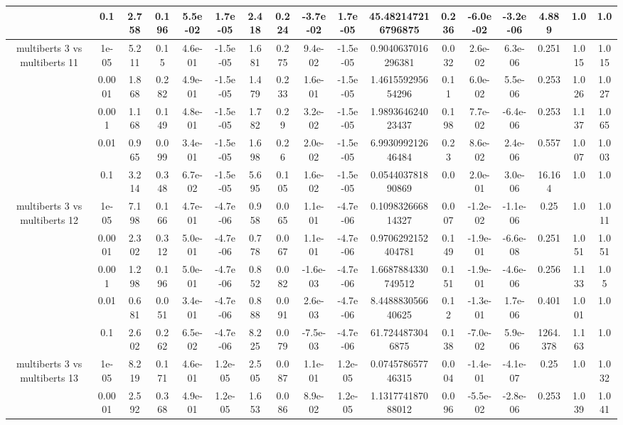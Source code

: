 \begin{tabular}{|c|c|c|c|c|c|c|c|c|c|c|c|c|c|c|c|c|}
 & 0.1 & 2.758 & 0.196 & 5.5e-02 & 1.7e-05 & 2.418 & 0.224 & -3.7e-02 & 1.7e-05 & 45.482147216796875 & 0.236 & -6.0e-02 & -3.2e-06 & 4.889 & 1.0 & 1.0 \\
\hline
\multirow{5}{*}{multiberts 3 vs multiberts 11} & 1e-05 & 5.211 & 0.15 & 4.6e-01 & -1.5e-05 & 1.681 & 0.275 & 9.4e-02 & -1.5e-05 & 0.9040637016296381 & 0.032 & 2.6e-02 & 6.3e-06 & 0.251 & 1.015 & 1.015 \\
 & 0.0001 & 1.868 & 0.282 & 4.9e-01 & -1.5e-05 & 1.479 & 0.233 & 1.6e-01 & -1.5e-05 & 1.461559295654296 & 0.11 & 6.0e-02 & 5.5e-06 & 0.253 & 1.026 & 1.027 \\
 & 0.001 & 1.168 & 0.149 & 4.8e-01 & -1.5e-05 & 1.782 & 0.29 & 3.2e-02 & -1.5e-05 & 1.989364624023437 & 0.198 & 7.7e-02 & -6.4e-06 & 0.253 & 1.137 & 1.065 \\
 & 0.01 & 0.965 & 0.099 & 3.4e-01 & -1.5e-05 & 1.698 & 0.26 & 2.0e-02 & -1.5e-05 & 6.993099212646484 & 0.23 & 8.6e-02 & 2.4e-06 & 0.557 & 1.007 & 1.003 \\
 & 0.1 & 3.214 & 0.348 & 6.7e-02 & -1.5e-05 & 5.695 & 0.105 & 1.6e-02 & -1.5e-05 & 0.054403781890869 & 0.0 & 2.0e-01 & 3.0e-06 & 16.164 & 1.0 & 1.0 \\
\hline
\multirow{5}{*}{multiberts 3 vs multiberts 12} & 1e-05 & 7.198 & 0.166 & 4.7e-01 & -4.7e-06 & 0.958 & 0.065 & 1.1e-01 & -4.7e-06 & 0.109832666814327 & 0.007 & -1.2e-02 & -1.1e-06 & 0.25 & 1.0 & 1.011 \\
 & 0.0001 & 2.302 & 0.312 & 5.0e-01 & -4.7e-06 & 0.778 & 0.067 & 1.1e-01 & -4.7e-06 & 0.9706292152404781 & 0.149 & -1.9e-01 & -6.6e-08 & 0.251 & 1.051 & 1.051 \\
 & 0.001 & 1.298 & 0.196 & 5.0e-01 & -4.7e-06 & 0.852 & 0.082 & -1.6e-03 & -4.7e-06 & 1.6687884330749512 & 0.151 & -1.9e-01 & -4.6e-06 & 0.256 & 1.133 & 1.05 \\
 & 0.01 & 0.681 & 0.051 & 3.4e-01 & -4.7e-06 & 0.888 & 0.091 & 2.6e-03 & -4.7e-06 & 8.448883056640625 & 0.12 & -1.3e-01 & 1.7e-06 & 0.401 & 1.001 & 1.0 \\
 & 0.1 & 2.602 & 0.262 & 6.5e-02 & -4.7e-06 & 8.225 & 0.079 & -7.5e-03 & -4.7e-06 & 61.7244873046875 & 0.138 & -7.0e-02 & 5.9e-06 & 1264.378 & 1.163 & 1.0 \\
\hline
\multirow{5}{*}{multiberts 3 vs multiberts 13} & 1e-05 & 8.219 & 0.171 & 4.6e-01 & 1.2e-05 & 2.505 & 0.087 & 1.1e-01 & 1.2e-05 & 0.074578657746315 & 0.004 & -1.4e-01 & -4.1e-07 & 0.25 & 1.0 & 1.032 \\
 & 0.0001 & 2.592 & 0.368 & 4.9e-01 & 1.2e-05 & 1.653 & 0.086 & 8.9e-02 & 1.2e-05 & 1.131774187088012 & 0.096 & -5.5e-02 & -2.8e-06 & 0.253 & 1.039 & 1.041 \\

\end{tabular}
